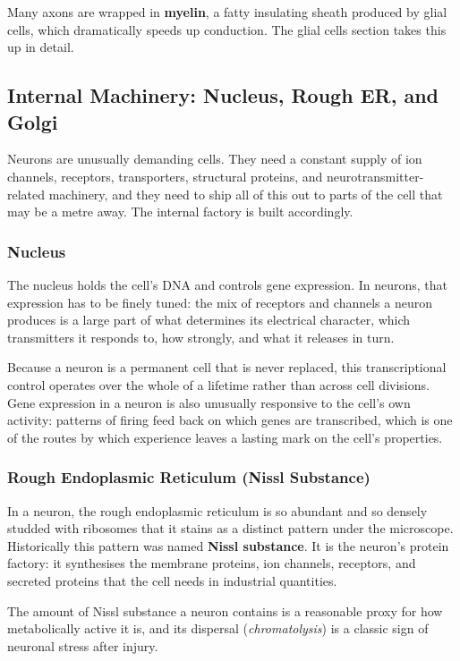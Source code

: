 \documentclass[11pt]{article}
\begin{document}
Many axons are wrapped in \textbf{myelin}, a fatty insulating sheath produced by glial cells, which dramatically speeds up conduction. The glial cells section takes this up in detail.

\subsection{Internal Machinery: Nucleus, Rough ER, and Golgi}

Neurons are unusually demanding cells. They need a constant supply of ion channels, receptors, transporters, structural proteins, and neurotransmitter-related machinery, and they need to ship all of this out to parts of the cell that may be a metre away. The internal factory is built accordingly.

\subsubsection{Nucleus}

The nucleus holds the cell's DNA and controls gene expression. In neurons, that expression has to be finely tuned: the mix of receptors and channels a neuron produces is a large part of what determines its electrical character, which transmitters it responds to, how strongly, and what it releases in turn.

Because a neuron is a permanent cell that is never replaced, this transcriptional control operates over the whole of a lifetime rather than across cell divisions. Gene expression in a neuron is also unusually responsive to the cell's own activity: patterns of firing feed back on which genes are transcribed, which is one of the routes by which experience leaves a lasting mark on the cell's properties.

\subsubsection{Rough Endoplasmic Reticulum (Nissl Substance)}

In a neuron, the rough endoplasmic reticulum is so abundant and so densely studded with ribosomes that it stains as a distinct pattern under the microscope. Historically this pattern was named \textbf{Nissl substance}. It is the neuron's protein factory: it synthesises the membrane proteins, ion channels, receptors, and secreted proteins that the cell needs in industrial quantities.

The amount of Nissl substance a neuron contains is a reasonable proxy for how metabolically active it is, and its dispersal (\textit{chromatolysis}) is a classic sign of neuronal stress after injury.
\end{document}
